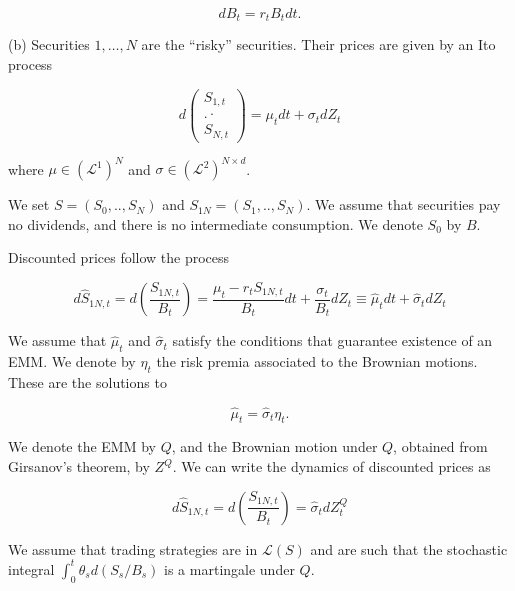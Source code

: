 \documentclass[\topdir/lecture\_notes.tex]{subfiles}
\begin{document}
\begin{equation*}
d B_{t}=r_{t} B_{t} d t .
\end{equation*}

(b) Securities $1, \ldots, N$ are the ``risky'' securities. Their prices are given by an Ito process

\begin{equation*}
d\left(\begin{array}{c}
S_{1, t} \\
. \cdot \\
S_{N, t}
\end{array}\right)=\mu_{t} d t+\sigma_{t} d Z_{t}
\end{equation*}

where $\mu \in\left(\mathcal{L}^{1}\right)^{N}$ and $\sigma \in\left(\mathcal{L}^{2}\right)^{N \times d}$.

We set $S=\left(S_{0}, . ., S_{N}\right)$ and $S_{1 N}=\left(S_{1}, . ., S_{N}\right)$. We assume that securities pay no dividends, and there is no intermediate consumption. We denote $S_{0}$ by $B$.

Discounted prices follow the process

\begin{equation*}
d \hat{S}_{1 N, t}=d\left(\frac{S_{1 N, t}}{B_{t}}\right)=\frac{\mu_{t}-r_{t} S_{1 N, t}}{B_{t}} d t+\frac{\sigma_{t}}{B_{t}} d Z_{t} \equiv \hat{\mu}_{t} d t+\hat{\sigma}_{t} d Z_{t}
\end{equation*}

We assume that $\hat{\mu}_{t}$ and $\hat{\sigma}_{t}$ satisfy the conditions that guarantee existence of an EMM. We denote by $\eta_{t}$ the risk premia associated to the Brownian motions. These are the solutions to

\begin{equation*}
\hat{\mu}_{t}=\hat{\sigma}_{t} \eta_{t} .
\end{equation*}

We denote the EMM by $Q$, and the Brownian motion under $Q$, obtained from Girsanov's theorem, by $Z^{Q}$. We can write the dynamics of discounted prices as

\begin{equation*}
d \hat{S}_{1 N, t}=d\left(\frac{S_{1 N, t}}{B_{t}}\right)=\hat{\sigma}_{t} d Z_{t}^{Q}
\end{equation*}

We assume that trading strategies are in $\mathcal{L}(S)$ and are such that the stochastic integral $\int_{0}^{t} \theta_{s} d\left(S_{s} / B_{s}\right)$ is a martingale under $Q$.
\end{document}
